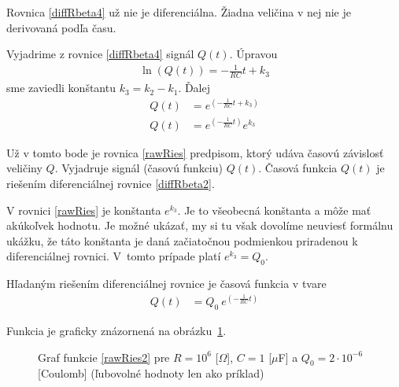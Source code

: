\documentclass[a4paper, 10pt, ]{article}
\begin{document}
\bigskip

Rovnica \eqref{diffRbeta4} už nie je diferenciálna. Žiadna veličina v nej nie je derivovaná podľa času.

Vyjadrime z rovnice \eqref{diffRbeta4} signál $Q(t)$. Úpravou
\begin{align}
    \ln \left(  Q(t)  \right)  =   - \frac{1}{RC} t + k_3
\end{align}
sme zaviedli konštantu $k_3 = k_2 - k_1$. Ďalej
\begin{subequations}
    \begin{align}
        Q(t)   &=  e^{\left( - \frac{1}{RC} t + k_3 \right)} \\
        Q(t)   &=  e^{\left( - \frac{1}{RC} t \right)}  e^{k_3} \label{rawRies}
    \end{align}
\end{subequations}

Už v tomto bode je rovnica \eqref{rawRies} predpisom, ktorý udáva časovú závislosť veličiny $Q$. Vyjadruje signál (časovú funkciu) $Q(t)$. Časová funkcia $Q(t)$ je riešením diferenciálnej rovnice \eqref{diffRbeta2}.

V rovnici \eqref{rawRies} je konštanta $e^{k_3}$. Je to všeobecná konštanta a môže mať akúkoľvek hodnotu. Je možné ukázať, my si tu však dovolíme neuviesť formálnu ukážku, že táto konštanta je daná začiatočnou podmienkou priradenou k diferenciálnej rovnici. V~tomto prípade platí $e^{k_3} = Q_0$.

Hľadaným riešením diferenciálnej rovnice je časová funkcia v tvare
\begin{align}
    Q(t)   &=  Q_0 \ e^{\left( - \frac{1}{RC} t \right)}   \label{rawRies2}
\end{align}


\noindent
Funkcia je graficky znázornená na obrázku~\ref{Graffunkcie}.










\begin{figure}[!t]
	\centering


	\caption{Graf funkcie \eqref{rawRies2} pre $R = 10^6$ [$\Omega$], $C = 1$ [$\mu$F] a $Q_0 = 2\cdot 10^{-6}$ [Coulomb] (ľubovolné hodnoty len ako príklad)}
	\label{Graffunkcie}
\end{figure}
\end{document}
